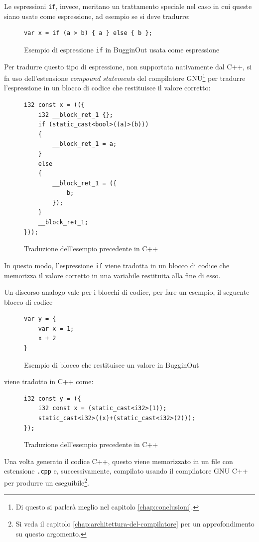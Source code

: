 Le espressioni \texttt{if}, invece, meritano un trattamento speciale nel caso in cui queste siano usate come espressione, ad esempio se si deve tradurre:
\begin{figure}[H]
	\centering
	\begin{verbatim}
var x = if (a > b) { a } else { b };
	\end{verbatim}
	\label{fig:bugginout-if-expression}
	\caption{Esempio di espressione \texttt{if} in BugginOut usata come espressione}
\end{figure}
Per tradurre questo tipo di espressione, non supportata nativamente dal C++, si fa uso dell'estensione \emph{compound statements} del compilatore GNU\footnote{Di questo si parler\`a meglio nel capitolo \ref{chap:conclusioni}.} per tradurre l'espressione in un blocco di codice che restituisce il valore corretto:
\begin{figure}[H]
	\centering
	\begin{verbatim}
i32 const x = (({
    i32 __block_ret_1 {};
    if (static_cast<bool>((a)>(b)))
    {
        __block_ret_1 = a;
    }
    else
    {
        __block_ret_1 = ({
            b;
        });
    }
    __block_ret_1;
}));
	\end{verbatim}
	\label{fig:bugginout-if-expression-transpiled}
	\caption{Traduzione dell'esempio precedente in C++}
\end{figure}
In questo modo, l'espressione \texttt{if} viene tradotta in un blocco di codice che memorizza il valore corretto in una variabile restituita alla fine di esso.

Un discorso analogo vale per i blocchi di codice, per fare un esempio, il seguente blocco di codice
\begin{figure}[H]
	\centering
	\begin{verbatim}
var y = {
    var x = 1;
    x + 2
}
	\end{verbatim}
	\label{fig:bugginout-block-expression}
	\caption{Esempio di blocco che restituisce un valore in BugginOut}
\end{figure}
viene tradotto in C++ come:
\begin{figure}[H]
	\centering
	\begin{verbatim}
i32 const y = ({
    i32 const x = (static_cast<i32>(1));
    static_cast<i32>((x)+(static_cast<i32>(2)));
});
	\end{verbatim}
	\label{fig:bugginout-block-expression-transpiled}
	\caption{Traduzione dell'esempio precedente in C++}
\end{figure}

Una volta generato il codice C++, questo viene memorizzato in un file con estensione \texttt{.cpp} e, successivamente, compilato usando il compilatore GNU C++ per produrre un eseguibile\footnote{Si veda il capitolo \ref{chap:architettura-del-compilatore} per un approfondimento su questo argomento.}.
